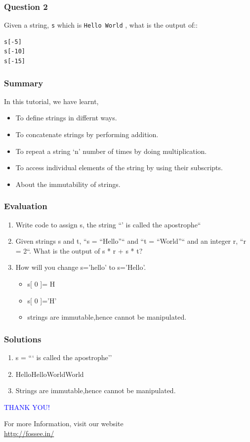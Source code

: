 \documentclass[presentation]{beamer}
\begin{document}
\begin{frame}[fragile]
\frametitle{Question 2}
\label{sec-4}

  Given a string, \verb~s~ which is \verb~Hello World~ , what is the output of::
\lstset{language=Python}
\begin{lstlisting}
s[-5] 
s[-10]
s[-15]
\end{lstlisting}
\end{frame}
\begin{frame}
\frametitle{Summary}
\label{sec-5}

  In this tutorial, we have learnt,

\begin{itemize}
\item To define strings in differnt ways.
\item To concatenate strings by performing addition.
\item To repeat a string `n' number of times by doing multiplication.
\item To access individual elements of the string by using their subscripts.
\item About the immutability of strings.
\end{itemize}
\end{frame}
\begin{frame}
\frametitle{Evaluation}
\label{sec-6}


\begin{enumerate}
\item Write code to assign s, the string ``' is called the apostrophe``
\item Given strings s and t, ``s = ``Hello''`` and ``t = ``World''`` and an
   integer r, ``r = 2``. What is the output of s * r + s * t?
\item How will you change s='hello' to s='Hello'.
\begin{itemize}
\item s[ 0 ]= H
\item s[ 0 ]='H'
\item strings are immutable,hence cannot be manipulated.
\end{itemize}
\end{enumerate}
\end{frame}
\begin{frame}
\frametitle{Solutions}
\label{sec-7}


\begin{enumerate}
\item s = ``` is called the apostrophe''
\item HelloHelloWorldWorld
\item Strings are immutable,hence cannot be manipulated.
\end{enumerate}
\end{frame}
\begin{frame}

  \begin{block}{}
  \begin{center}
  \textcolor{blue}{\Large THANK YOU!} 
  \end{center}
  \end{block}
\begin{block}{}
  \begin{center}
    For more Information, visit our website\\
    \url{http://fossee.in/}
  \end{center}  
  \end{block}
 
\end{frame}
\end{document}
